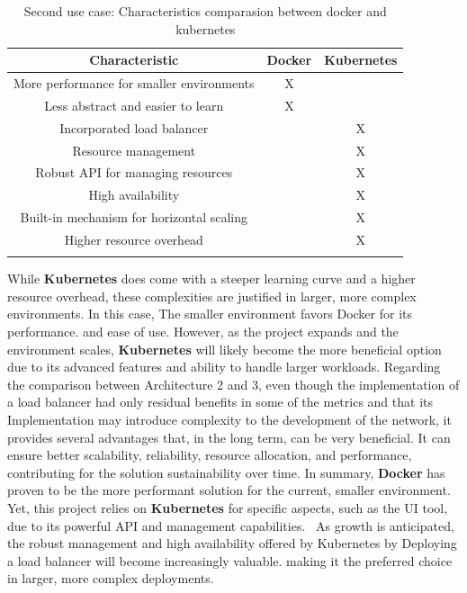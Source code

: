 \begin{longtable}{| c | c | c |}
	\hline
	 \textbf{Characteristic} & \textbf{Docker} & \textbf{Kubernetes} \\ \hline
	
	More performance for smaller environments & X & \\ \hline
	
    Less abstract and easier to learn & X & \\ \hline
	
	Incorporated load balancer &  & X \\ \hline
	
	Resource management &  & X \\ \hline
	
	Robust API for managing resources &  & X \\ \hline
	
	High availability &  & X \\ \hline
	
	Built-in mechanism for horizontal scaling &  & X \\ \hline
	
	Higher resource overhead &  & X \\ \hline
	
	\caption{Second use case: Characteristics comparasion between docker and kubernetes} \label{tab:activity_schedule} 
\end{longtable}

While \textbf{Kubernetes} does come with a steeper learning
curve and a higher resource overhead, these complexities are
justified in larger, more complex environments. In this case,
The smaller environment favors Docker for its performance.
and ease of use. However, as the project expands and the
environment scales, \textbf{Kubernetes} will likely become the more
beneficial option due to its advanced features and ability to
handle larger workloads.
Regarding the comparison between Architecture 2 and 3,
even though the implementation of a load balancer had only
residual benefits in some of the metrics and that its
Implementation may introduce complexity to the
development of the network, it provides several advantages
that, in the long term, can be very beneficial. It can ensure
better scalability, reliability, resource allocation, and
performance, contributing for the solution sustainability over
time.
In summary, \textbf{Docker} has proven to be the more
performant solution for the current, smaller environment.
Yet, this project relies on \textbf{Kubernetes} for specific aspects,
such as the UI tool, due to its powerful API and management
capabilities.  As growth is anticipated, the robust
management and high availability offered by Kubernetes by
Deploying a load balancer will become increasingly valuable.
making it the preferred choice in larger, more complex
deployments. 

